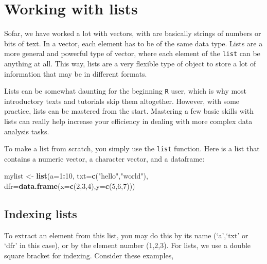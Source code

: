 \documentclass[]{book}
\newenvironment{Shaded}{\begin{snugshade}}{\end{snugshade}}
\newcommand{\DataTypeTok}[1]{\textcolor[rgb]{0.13,0.29,0.53}{#1}}
\newcommand{\DecValTok}[1]{\textcolor[rgb]{0.00,0.00,0.81}{#1}}
\newcommand{\KeywordTok}[1]{\textcolor[rgb]{0.13,0.29,0.53}{\textbf{#1}}}
\newcommand{\NormalTok}[1]{#1}
\newcommand{\OperatorTok}[1]{\textcolor[rgb]{0.81,0.36,0.00}{\textbf{#1}}}
\newcommand{\StringTok}[1]{\textcolor[rgb]{0.31,0.60,0.02}{#1}}
\begin{document}
\hypertarget{workinglists}{%
\section{Working with lists}\label{workinglists}}

Sofar, we have worked a lot with vectors, with are basically strings of numbers or bits of text. In a vector, each element has to be of the same data type. Lists are a more general and powerful type of vector, where each element of the \texttt{list} can be anything at all. This way, lists are a very flexible type of object to store a lot of information that may be in different formats.

Lists can be somewhat daunting for the beginning \texttt{R} user, which is why most introductory texts and tutorials skip them altogether. However, with some practice, lists can be mastered from the start. Mastering a few basic skills with lists can really help increase your efficiency in dealing with more complex data analysis tasks.

To make a list from scratch, you simply use the \texttt{list} function. Here is a list that contains a numeric vector, a character vector, and a dataframe:

\begin{Shaded}
\begin{Highlighting}[]
\NormalTok{mylist <-}\StringTok{ }\KeywordTok{list}\NormalTok{(}\DataTypeTok{a=}\DecValTok{1}\OperatorTok{:}\DecValTok{10}\NormalTok{, }\DataTypeTok{txt=}\KeywordTok{c}\NormalTok{(}\StringTok{"hello"}\NormalTok{,}\StringTok{"world"}\NormalTok{), }\DataTypeTok{dfr=}\KeywordTok{data.frame}\NormalTok{(}\DataTypeTok{x=}\KeywordTok{c}\NormalTok{(}\DecValTok{2}\NormalTok{,}\DecValTok{3}\NormalTok{,}\DecValTok{4}\NormalTok{),}\DataTypeTok{y=}\KeywordTok{c}\NormalTok{(}\DecValTok{5}\NormalTok{,}\DecValTok{6}\NormalTok{,}\DecValTok{7}\NormalTok{)))}
\end{Highlighting}
\end{Shaded}

\hypertarget{indexing-lists}{%
\subsection{Indexing lists}\label{indexing-lists}}

To extract an element from this list, you may do this by its name (`a',`txt' or `dfr' in this case), or by the element number (1,2,3). For lists, we use a double square bracket for indexing. Consider these examples,
\end{document}

